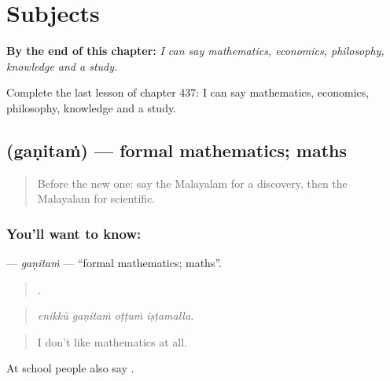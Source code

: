 
\chapter{Subjects}
\label{ch:ml-subjects}

\begin{chapteropening}
\textbf{By the end of this chapter:} \emph{I can say mathematics, economics, philosophy, knowledge and a study.}

Complete the last lesson of chapter 437: I can say mathematics, economics, philosophy, knowledge and a study.
\end{chapteropening}

\section[\texorpdfstring{\ml{ഗണിതം} (gaṇitaṁ)}{ഗണിതം (gaṇitaṁ)}]{ (gaṇitaṁ) — formal mathematics; maths}

\label{lesson:ML-C437-ganitam}



\begin{quote}
Before the new one: say the Malayalam for a discovery, then the Malayalam for scientific.
\end{quote}

\subsection*{You'll want to know: }
\textbf{} — \emph{gaṇitaṁ} — \textquotedblleft{}formal mathematics; maths\textquotedblright{}.

\begin{quote}
   .
\end{quote}

\begin{quote}
\emph{enikkŭ gaṇitaṁ oṭṭuṁ iṣṭamalla.}
\end{quote}

\begin{quote}
I don't like mathematics at all.
\end{quote}

At school people also say .

